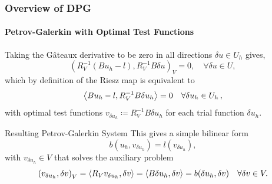 \documentclass[18pt,xcolor=table]{beamer}
\begin{document}
\begin{frame}[t]
\frametitle{Overview of DPG}
\framesubtitle{Petrov-Galerkin with Optimal Test Functions}
Taking the G\^ateaux derivative to be zero in all directions $\delta u \in
U_h$ gives,
\[
\left(R_V^{-1}(Bu_h-l),R_V^{-1}B\delta u\right)_V = 0, \quad \forall \delta u \in U,
\]
which by definition of the Riesz map is equivalent to 
\begin{equation*}
\left\langle Bu_h-l,R_V^{-1}B\delta u_h \right\rangle=0\quad\forall\delta u_h\in U_h\,,
\end{equation*}
with optimal test functions $v_{\delta u_h}\coloneqq R_V^{-1}B\delta u_h$ for each trial function $\delta u_h$.
\begin{block}{Resulting Petrov-Galerkin System}
This gives a simple bilinear form
\begin{equation*}
b(u_h,v_{\delta u_h})=l(v_{\delta u_h}),
\end{equation*}
with $v_{\delta u_h}\in V$ that solves the auxiliary problem
\begin{equation*}
\left( v_{\delta u_h},\delta v \right)_V=\left\langle R_Vv_{\delta u_h},\delta v \right\rangle
=\left\langle B\delta u_h,\delta v \right\rangle=b(\delta u_h,\delta v)\quad\forall\delta v\in V.
\end{equation*}
\end{block}
\end{frame}

\end{document}
